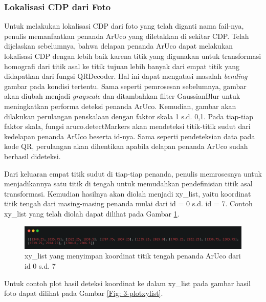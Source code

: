 \subsubsection{Lokalisasi CDP dari Foto}
Untuk melakukan lokalisasi CDP dari foto yang telah diganti nama fail-nya, penulis memanfaatkan penanda ArUco yang diletakkan di sekitar CDP. Telah dijelaskan
sebelumnya, bahwa delapan penanda ArUco dapat melakukan lokalisasi CDP dengan lebih baik karena titik yang digunakan untuk transformasi homografi dari titik
asal ke titik tujuan lebih banyak dari empat titik yang didapatkan dari fungsi QRDecoder. Hal ini dapat mengatasi masalah \emph{bending} gambar pada kondisi
tertentu. Sama seperti pemrosesan sebelumnya, gambar akan diubah menjadi \emph{grayscale} dan ditambahkan filter GaussianBlur untuk meningkatkan performa
deteksi penanda ArUco. Kemudian, gambar akan dilakukan perulangan penskalaan dengan faktor skala 1 s.d. 0,1. Pada tiap-tiap faktor skala, fungsi
aruco.detectMarkers akan mendeteksi titik-titik sudut dari kedelapan penanda ArUco beserta id-nya. Sama seperti pendeteksian data pada kode QR, perulangan akan
dihentikan apabila delapan penanda ArUco sudah berhasil dideteksi.

Dari keluaran empat titik sudut di tiap-tiap penanda, penulis memrosesnya untuk menjadikannya satu titik di tengah untuk memudahkan pendefinisian titik asal
transformasi. Kemudian hasilnya akan diolah menjadi xy\_list, yaitu koordinat titik tengah dari masing-masing penanda mulai dari id = 0 s.d. id = 7. Contoh
xy\_list yang telah diolah dapat dilihat pada Gambar \ref{Fig: 3-xylist}.

\begin{figure}[h]
	\centering
	\includegraphics[width=13cm]{contents/chapter-3/3-xylist.png}
	\caption{xy\_list yang menyimpan koordinat titik tengah penanda ArUco dari id 0 s.d. 7}
	\label{Fig: 3-xylist}
\end{figure}

\noindent Untuk contoh plot hasil deteksi koordinat ke dalam xy\_list pada gambar hasil foto dapat dilihat pada Gambar \ref{Fig: 3-plotxylist}.

